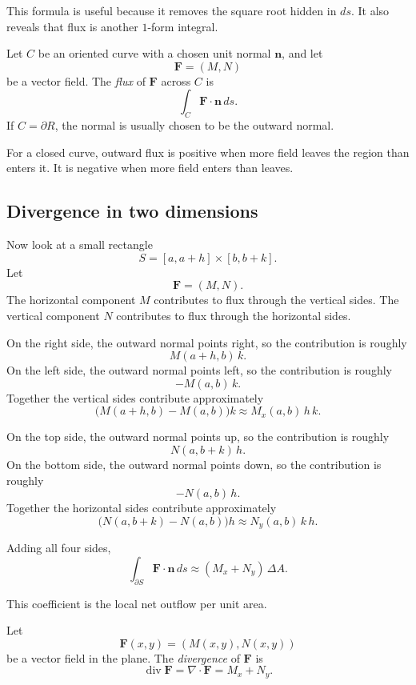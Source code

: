 This formula is useful because it removes the square root hidden in \(ds\).  It also
reveals that flux is another \(1\)-form integral.

\begin{definition}
Let \(C\) be an oriented curve with a chosen unit normal \(\mathbf n\), and let
\[
    \mathbf F=(M,N)
\]
be a vector field.  The \emph{flux} of \(\mathbf F\) across \(C\) is
\[
\boxed{
    \int_C \mathbf F\cdot\mathbf n\,ds.
}
\]
If \(C=\partial R\), the normal is usually chosen to be the outward normal.
\end{definition}

For a closed curve, outward flux is positive when more field leaves the region than
enters it.  It is negative when more field enters than leaves.

\subsection{Divergence in two dimensions}

Now look at a small rectangle
\[
    S=[a,a+h]\times[b,b+k].
\]
Let
\[
    \mathbf F=(M,N).
\]
The horizontal component \(M\) contributes to flux through the vertical sides.  The
vertical component \(N\) contributes to flux through the horizontal sides.

On the right side, the outward normal points right, so the contribution is roughly
\[
    M(a+h,b)\,k.
\]
On the left side, the outward normal points left, so the contribution is roughly
\[
    -M(a,b)\,k.
\]
Together the vertical sides contribute approximately
\[
    \bigl(M(a+h,b)-M(a,b)\bigr)k
    \approx
    M_x(a,b)\,h\,k.
\]

On the top side, the outward normal points up, so the contribution is roughly
\[
    N(a,b+k)\,h.
\]
On the bottom side, the outward normal points down, so the contribution is roughly
\[
    -N(a,b)\,h.
\]
Together the horizontal sides contribute approximately
\[
    \bigl(N(a,b+k)-N(a,b)\bigr)h
    \approx
    N_y(a,b)\,k\,h.
\]

Adding all four sides,
\[
\boxed{
    \int_{\partial S}\mathbf F\cdot\mathbf n\,ds
    \approx
    (M_x+N_y)\,\Delta A.
}
\]

This coefficient is the local net outflow per unit area.

\begin{definition}
Let
\[
    \mathbf F(x,y)=(M(x,y),N(x,y))
\]
be a vector field in the plane.  The \emph{divergence} of \(\mathbf F\) is
\[
\boxed{
    \operatorname{div}\mathbf F
    =
    \nabla\cdot\mathbf F
    =
    M_x+N_y.
}
\]
\end{definition}

